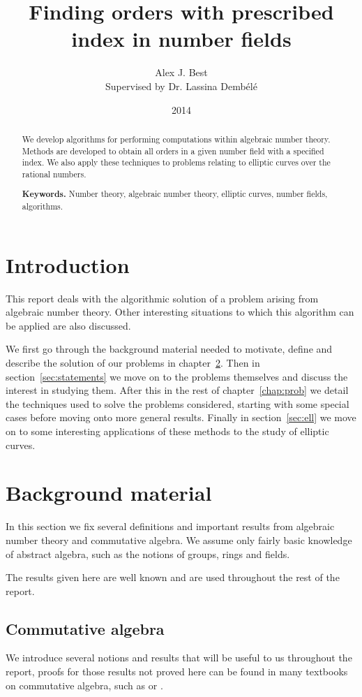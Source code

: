 \documentclass[a4paper,abstracton]{scrreprt}
\author{Alex J. Best \\Supervised by Dr. Lassina Demb\'el\'e}
\date{2014}
\title{Finding orders with prescribed index in number fields}
\theoremstyle{definition}
\begin{document}
\maketitle

\begin{abstract}
We develop algorithms for performing computations within algebraic number theory.
Methods are developed to obtain all orders in a given number field with a specified index.
We also apply these techniques to problems relating to elliptic curves over the rational numbers.

\smallskip
\noindent \textbf{Keywords.} Number theory, algebraic number theory, elliptic curves, number fields, algorithms.
\end{abstract}

\tableofcontents

\chapter{Introduction}
This report deals with the algorithmic solution of a problem arising from algebraic number theory. 
Other interesting situations to which this algorithm can be applied are also discussed.

We first go through the background material needed to motivate, define and describe the solution of our problems in chapter~\ref{chap:background}.
Then in section~\ref{sec:statements} we move on to the problems themselves and discuss the interest in studying them.
After this in the rest of chapter~\ref{chap:prob} we detail the techniques used to solve the problems considered, starting with some special cases before moving onto more general results.
Finally in section~\ref{sec:ell} we move on to some interesting applications of these methods to the study of elliptic curves.

\chapter{Background material}
\label{chap:background}

In this section we fix several definitions and important results from algebraic number theory and commutative algebra.
We assume only fairly basic knowledge of abstract algebra, such as the notions of groups, rings and fields.

The results given here are well known and are used throughout the rest of the report.

\section{Commutative algebra}
We introduce several notions and results that will be useful to us throughout the report, proofs for those results not proved here can be found in many textbooks on commutative algebra, such as \cite{am} or \cite{matsumura}.
\end{document}
